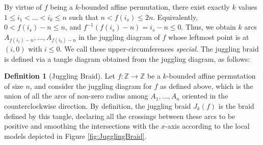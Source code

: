 \documentclass[10pt]{amsart}
\theoremstyle{plain}
\theoremstyle{definition}
\newtheorem{definition}[thm]{Definition}
\theoremstyle{remark}
\numberwithin{equation}{section}
\newcommand{\N}{\mathbb{N}}
\newcommand{\Z}{\mathbb{Z}}
\newcommand{\R}{\mathbb{R}}
\newcommand{\La}{\Lambda}
\newcommand{\sse}{\subseteq}
\newcommand{\lr}{\longrightarrow}
\newcommand{\std}{\text{st}}
\newcommand{\MG}[1]{{\color{teal}{{\bf Misha}: #1}}}
\begin{document}

 By virtue of $f$ being a $k$-bounded affine permutation, there exist exactly $k$ values $1 \leq i_1 < \ldots < i_k\leq n$  such that $n< f(i_s)\le 2n$. Equivalently, $0 < f(i_s) - n \leq n$, and $f^{-1}(f(i_s) - n) = i_s - n \leq 0$. Thus, we obtain $k$ arcs $A_{f(i_1) - n}, \dots, A_{f(i_k) - n}$ in the juggling diagram of $f$ whose leftmost point is at $(i, 0)$ with $i \leq 0$. %
 We call these upper-circumferences \emph{special}. The juggling braid is defined via a tangle diagram obtained from the juggling diagram, as follows:

\begin{definition}[Juggling Braid]\label{def:juggling}  Let $f: \Z\lr\Z$ be a $k$-bounded affine permutation of size $n$, and consider the juggling diagram for $f$ as defined above, which is the union of all the arcs of non-zero radius among $A_{1}, \dots, A_{n}$ oriented in the counterclockwise direction. By definition, the juggling braid $J_k(f)$ is the braid defined by this tangle, declaring all the crossings between these arcs to be positive and smoothing the intersections with the $x$-axis according to the local models depicted in Figure \ref{fig:JugglingBraid}.
\end{definition}



\end{document}
